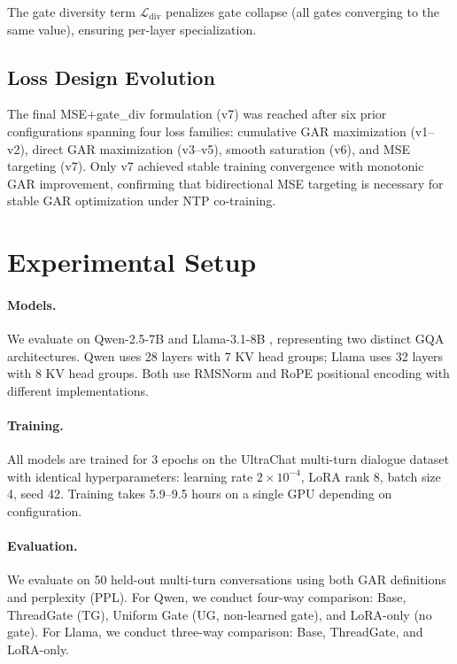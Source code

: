 \documentclass[11pt,a4paper]{article}
\begin{document}
The gate diversity term $\mathcal{L}_{\text{div}}$ penalizes gate collapse (all gates converging to the same value), ensuring per-layer specialization.

\subsection{Loss Design Evolution}

The final MSE+gate\_div formulation (v7) was reached after six prior configurations spanning four loss families: cumulative GAR maximization (v1--v2), direct GAR maximization (v3--v5), smooth saturation (v6), and MSE targeting (v7).
Only v7 achieved stable training convergence with monotonic GAR improvement, confirming that bidirectional MSE targeting is necessary for stable GAR optimization under NTP co-training.

\section{Experimental Setup}
\label{sec:setup}

\paragraph{Models.}
We evaluate on Qwen-2.5-7B \citep{qwen2025qwen25} and Llama-3.1-8B \citep{dubey2024llama3}, representing two distinct GQA architectures.
Qwen uses 28 layers with 7 KV head groups; Llama uses 32 layers with 8 KV head groups.
Both use RMSNorm and RoPE positional encoding with different implementations.

\paragraph{Training.}
All models are trained for 3 epochs on the UltraChat multi-turn dialogue dataset with identical hyperparameters: learning rate $2 \times 10^{-4}$, LoRA rank 8, batch size 4, seed 42.
Training takes 5.9--9.5 hours on a single GPU depending on configuration.

\paragraph{Evaluation.}
We evaluate on 50 held-out multi-turn conversations using both GAR definitions and perplexity (PPL).
For Qwen, we conduct four-way comparison: Base, ThreadGate (TG), Uniform Gate (UG, non-learned gate), and LoRA-only (no gate).
For Llama, we conduct three-way comparison: Base, ThreadGate, and LoRA-only.
\end{document}
